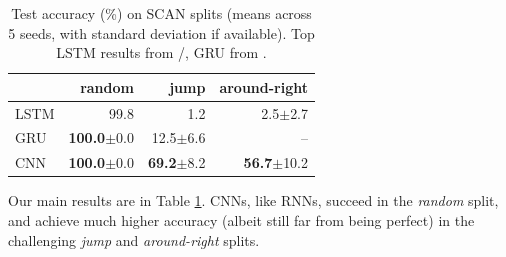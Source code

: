 \begin{table}[tb]
  \begin{footnotesize}
    \begin{center}
          \begin{tabular}{l | r | r | r}
             & \textbf{random} & \textbf{jump} & \textbf{around-right} \\ \hline
             LSTM & 99.8 & 1.2 & 2.5$\pm$2.7 \\
             GRU & \textbf{100.0}$\pm$0.0 & 12.5$\pm$6.6 & --  \\
             \hline
              CNN & \textbf{100.0}$\pm$0.0 & \textbf{69.2}$\pm$8.2 & \textbf{56.7}$\pm$10.2 \\
          \end{tabular} 
    \end{center}
  \end{footnotesize}
  \caption{Test accuracy (\%) on SCAN splits (means across 5 seeds,
    with standard deviation if available). Top LSTM results from
    /, GRU from
      .}
\label{table:main_results} 
\end{table}

Our main results are in Table \ref{table:main_results}. CNNs, like
RNNs, succeed in the \emph{random} split, and achieve much higher accuracy (albeit still far from being perfect)  in the challenging \emph{jump} and \emph{around-right}
splits.

